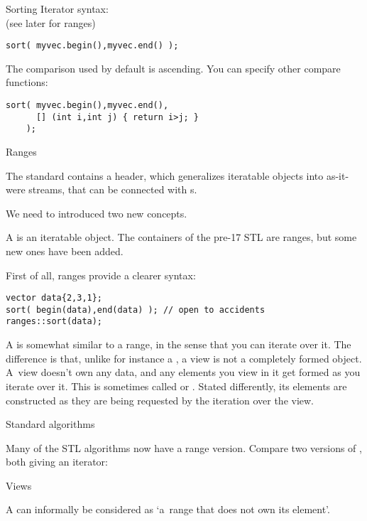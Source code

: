 \begin{slide}{Sorting}
  \label{sl:sort-it}
  Iterator syntax:\\
  (see later for ranges)
\begin{lstlisting}
sort( myvec.begin(),myvec.end() );
\end{lstlisting}
The comparison used by default is ascending.
You can specify other compare functions:
\begin{lstlisting}
sort( myvec.begin(),myvec.end(),
      [] (int i,int j) { return i>j; }
    );
\end{lstlisting}
\end{slide}

 {Ranges}

The  standard contains a  header,
which generalizes iteratable objects into as-it-were streams,
that can be connected with s.

We need to introduced two new concepts.

A  is an iteratable object.
The containers of the pre-17 \ac{STL} are ranges, but
some new ones have been added.

First of all, ranges provide a clearer syntax:
\begin{lstlisting}
vector data{2,3,1};
sort( begin(data),end(data) ); // open to accidents
ranges::sort(data);
\end{lstlisting}

A  is somewhat similar to a range, in the sense that
you can iterate over it.
The difference is that, unlike for instance a ,
a view is not a completely formed object.
A~view doesn't own any data, and any elements you view in it get formed
as you iterate over it.
This is sometimes called 
or .
Stated differently, its elements are constructed
as they are being requested by the iteration over the view.

 {Standard algorithms}

Many of the \ac{STL} algorithms now have a range version.
Compare two versions of ,
both giving an iterator:
\begin{multicols}{2}
  \columnbreak
\end{multicols}

 {Views}

A  can informally be considered as
`a~range that does not own its element'.

